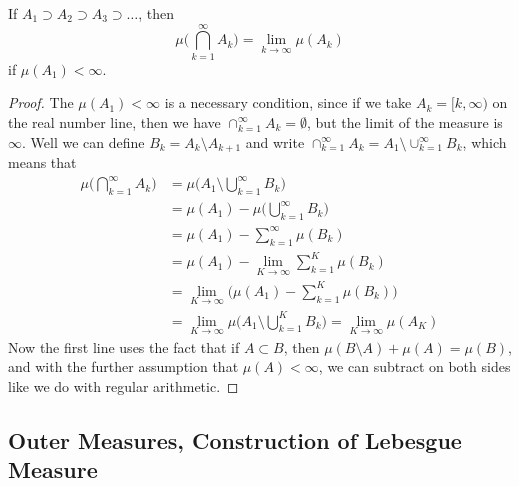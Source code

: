   \begin{proposition}
    If $A_1 \supset A_2 \supset A_3 \supset \ldots$, then 
    \begin{equation}
      \mu\bigg( \bigcap_{k=1}^\infty A_k \bigg) = \lim_{k \rightarrow \infty} \mu(A_k)
    \end{equation}
    if $\mu(A_1) < \infty$. 
  \end{proposition}
  \begin{proof}
    The $\mu(A_1) < \infty$ is a necessary condition, since if we take $A_k = [k, \infty)$ on the real number line, then we have $\cap_{k=1}^\infty A_k = \emptyset$, but the limit of the measure is $\infty$. Well we can define $B_k = A_k \setminus A_{k+1}$ and write $\cap_{k=1}^\infty A_k = A_1 \setminus \cup_{k=1}^\infty B_k$, which means that 
    \begin{align*}
      \mu\bigg( \bigcap_{k=1}^\infty A_k \bigg) & = \mu\bigg( A_1 \setminus \bigcup_{k=1}^\infty B_k \bigg) \\
      & = \mu(A_1) - \mu\bigg( \bigcup_{k=1}^\infty B_k\bigg) \\
      & = \mu(A_1) - \sum_{k=1}^\infty \mu(B_k) \\
      & = \mu(A_1) - \lim_{K \rightarrow \infty} \sum_{k=1}^K \mu(B_k) \\
      & = \lim_{K \rightarrow \infty} \bigg( \mu(A_1) - \sum_{k=1}^K \mu(B_k) \bigg) \\
      & = \lim_{K \rightarrow \infty} \mu \bigg( A_1 \setminus \bigcup_{k=1}^K B_k \bigg) = \lim_{K \rightarrow \infty} \mu(A_K)
    \end{align*}
    Now the first line uses the fact that if $A \subset B$, then $\mu(B \setminus A) + \mu(A) = \mu(B)$, and with the further assumption that $\mu(A) < \infty$, we can subtract on both sides like we do with regular arithmetic. 
  \end{proof}

\subsection{Outer Measures, Construction of Lebesgue Measure}

